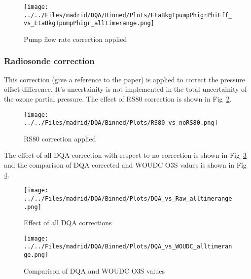                         \begin{figure}
        \centering
\texttt{[image: ../../Files/madrid/DQA/Binned/Plots/EtaBkgTpumpPhigrPhiEff\_vs\_EtaBkgTpumpPhigr\_alltimerange.png]}
    \caption{Pump flow rate correction applied}
            \label{fig:pf_eff}
    \end{figure}
%
 \subsubsection{Radiosonde correction}
    This correction (give a reference to the paper) is applied to correct the pressure offset difference. It's uncertainity is not implemented in the
total uncertainity of the ozone partial pressure. The effect of RS80 correction is shown in Fig~\ref{fig:rs80}. \\

                        \begin{figure}
        \centering
\texttt{[image: ../../Files/madrid/DQA/Binned/Plots/RS80\_vs\_noRS80.png]}
    \caption{RS80 correction applied}
            \label{fig:rs80}
    \end{figure}
%

The effect of all DQA correction with respect to no correction is shown in Fig~\ref{fig:dqa_all} and the comparison of DQA corrected and WOUDC O3S values is shown in Fig~
\ref{fig:fig_dqa_ndacc}.

                        \begin{figure}
        \centering
\texttt{[image: ../../Files/madrid/DQA/Binned/Plots/DQA\_vs\_Raw\_alltimerange.png]}
    \caption{Effect of all DQA corrections}
            \label{fig:dqa_all}
    \end{figure}

                        \begin{figure}
        \centering
\texttt{[image: ../../Files/madrid/DQA/Binned/Plots/DQA\_vs\_WOUDC\_alltimerange.png]}
    \caption{Comparison of DQA and WOUDC O3S values}
            \label{fig:fig_dqa_ndacc}
    \end{figure}


